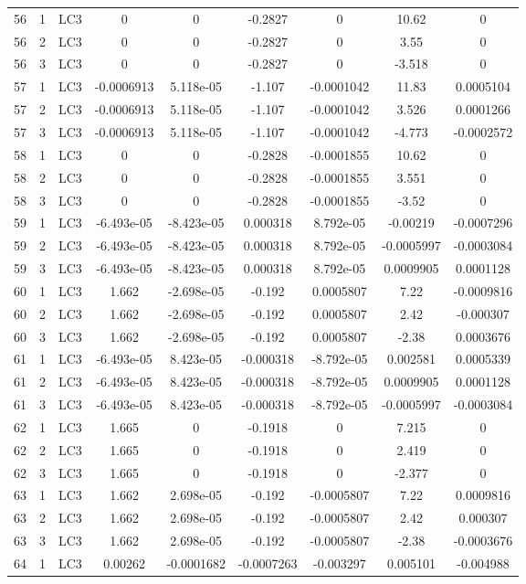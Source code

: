 \documentclass{article}%
\begin{document}
\begin{longtable}{| c c c | c c c c c c |}
56&1&LC3&0&0&{-}0.2827&0&10.62&0\\%
56&2&LC3&0&0&{-}0.2827&0&3.55&0\\%
56&3&LC3&0&0&{-}0.2827&0&{-}3.518&0\\%
57&1&LC3&{-}0.0006913&5.118e{-}05&{-}1.107&{-}0.0001042&11.83&0.0005104\\%
57&2&LC3&{-}0.0006913&5.118e{-}05&{-}1.107&{-}0.0001042&3.526&0.0001266\\%
57&3&LC3&{-}0.0006913&5.118e{-}05&{-}1.107&{-}0.0001042&{-}4.773&{-}0.0002572\\%
58&1&LC3&0&0&{-}0.2828&{-}0.0001855&10.62&0\\%
58&2&LC3&0&0&{-}0.2828&{-}0.0001855&3.551&0\\%
58&3&LC3&0&0&{-}0.2828&{-}0.0001855&{-}3.52&0\\%
59&1&LC3&{-}6.493e{-}05&{-}8.423e{-}05&0.000318&8.792e{-}05&{-}0.00219&{-}0.0007296\\%
59&2&LC3&{-}6.493e{-}05&{-}8.423e{-}05&0.000318&8.792e{-}05&{-}0.0005997&{-}0.0003084\\%
59&3&LC3&{-}6.493e{-}05&{-}8.423e{-}05&0.000318&8.792e{-}05&0.0009905&0.0001128\\%
60&1&LC3&1.662&{-}2.698e{-}05&{-}0.192&0.0005807&7.22&{-}0.0009816\\%
60&2&LC3&1.662&{-}2.698e{-}05&{-}0.192&0.0005807&2.42&{-}0.000307\\%
60&3&LC3&1.662&{-}2.698e{-}05&{-}0.192&0.0005807&{-}2.38&0.0003676\\%
61&1&LC3&{-}6.493e{-}05&8.423e{-}05&{-}0.000318&{-}8.792e{-}05&0.002581&0.0005339\\%
61&2&LC3&{-}6.493e{-}05&8.423e{-}05&{-}0.000318&{-}8.792e{-}05&0.0009905&0.0001128\\%
61&3&LC3&{-}6.493e{-}05&8.423e{-}05&{-}0.000318&{-}8.792e{-}05&{-}0.0005997&{-}0.0003084\\%
62&1&LC3&1.665&0&{-}0.1918&0&7.215&0\\%
62&2&LC3&1.665&0&{-}0.1918&0&2.419&0\\%
62&3&LC3&1.665&0&{-}0.1918&0&{-}2.377&0\\%
63&1&LC3&1.662&2.698e{-}05&{-}0.192&{-}0.0005807&7.22&0.0009816\\%
63&2&LC3&1.662&2.698e{-}05&{-}0.192&{-}0.0005807&2.42&0.000307\\%
63&3&LC3&1.662&2.698e{-}05&{-}0.192&{-}0.0005807&{-}2.38&{-}0.0003676\\%
64&1&LC3&0.00262&{-}0.0001682&{-}0.0007263&{-}0.003297&0.005101&{-}0.004988\\%

\end{longtable}
\end{document}

